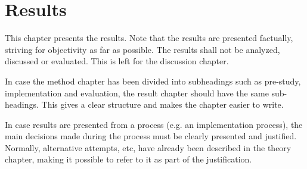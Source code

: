 
\chapter{Results}
\label{cha:results}

This chapter presents the results. Note that the results are presented
factually, striving for objectivity as far as possible.  The results
shall not be analyzed, discussed or evaluated.  This is left for the
discussion chapter.

In case the method chapter has been divided into subheadings such as
pre-study, implementation and evaluation, the result chapter should
have the same sub-headings. This gives a clear structure and makes the
chapter easier to write.

In case results are presented from a process (e.g. an implementation
process), the main decisions made during the process must be clearly
presented and justified. Normally, alternative attempts, etc, have
already been described in the theory chapter, making it possible to
refer to it as part of the justification.


